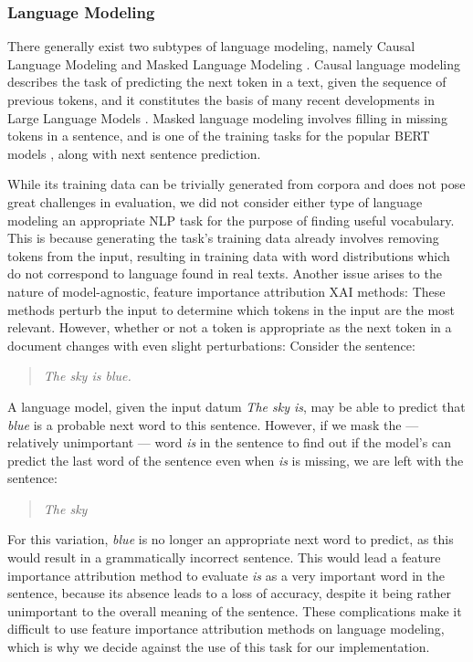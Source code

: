 \subsubsection{Language Modeling}
There generally exist two subtypes of language modeling, namely Causal Language Modeling and Masked Language Modeling \cite{jurafskySpeechLanguageProcessing2025a}.
Causal language modeling describes the task of predicting the next token in a text, given the sequence of previous tokens, and it constitutes the basis of many recent developments in Large Language Models \cite{brownLanguageModelsAre2020} \cite{openai2024gpt4technicalreport}.
Masked language modeling involves filling in missing tokens in a sentence, and is one of the training tasks for the popular BERT models \cite{kentonBertPretrainingDeep2019}, along with next sentence prediction.

While its training data can be trivially generated from corpora and does not pose great challenges in evaluation, we did not consider either type of language modeling an appropriate NLP task for the purpose of finding useful vocabulary.
This is because generating the task's training data already involves removing tokens from the input, resulting in training data with word distributions which do not correspond to language found in real texts.
Another issue arises to the nature of model-agnostic, feature importance attribution XAI methods:
These methods perturb the input to determine which tokens in the input are the most relevant.
However, whether or not a token is appropriate as the next token in a document changes with even slight perturbations:
Consider the sentence:

\begin{quote}
	\textit{The sky is blue.}
\end{quote}

A language model, given the input datum \textit{The sky is}, may be able to predict that \textit{blue} is a probable next word to this sentence.
However, if we mask the --- relatively unimportant --- word  \textit{is} in the sentence to find out if the model's can predict the last word of the sentence even when \textit{is} is missing, we are left with the sentence:

\begin{quote}
	\textit{The sky}
\end{quote}

For this variation, \textit{blue} is no longer an appropriate next word to predict, as this would result in a grammatically incorrect sentence.
This would lead a feature importance attribution method to evaluate \textit{is} as a very important word in the sentence, because its absence leads to a loss of accuracy, despite it being rather unimportant to the overall meaning of the sentence.
These complications make it difficult to use feature importance attribution methods on language modeling, which is why we decide against the use of this task for our implementation.


